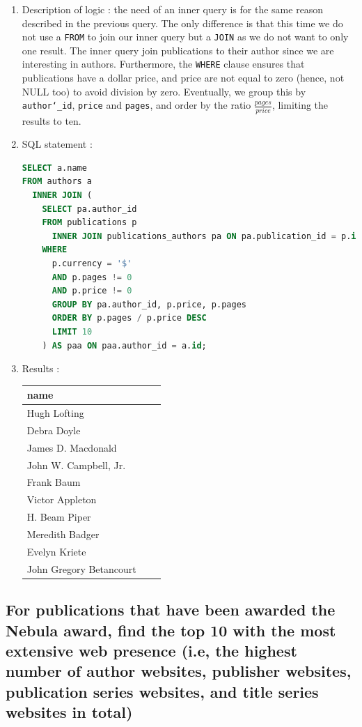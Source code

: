 \documentclass[doubleside, titlepage]{article}
\begin{document}
	\begin{enumerate}
	\item Description of logic : the need of an inner query is for the same reason described in the previous query. The only difference is that this time we do not use a \texttt{FROM} to join our inner query but a \texttt{JOIN} as we do not want to only one result. The inner query join publications to their author since we are interesting in authors. Furthermore, the \texttt{WHERE} clause ensures that publications have a dollar price, and price are not equal to zero (hence, not NULL too) to avoid division by zero. Eventually, we group this by \texttt{author\char`_id}, \texttt{price} and \texttt{pages}, and order by the ratio $\frac{pages}{price}$, limiting the results to ten.
	\item SQL statement :
		\begin{lstlisting}[language=SQL,showspaces=false,basicstyle=\ttfamily,numberstyle=\tiny,commentstyle=\color{gray}]
SELECT a.name
FROM authors a
  INNER JOIN (
    SELECT pa.author_id
    FROM publications p
      INNER JOIN publications_authors pa ON pa.publication_id = p.id
    WHERE
      p.currency = '$'
      AND p.pages != 0
      AND p.price != 0
      GROUP BY pa.author_id, p.price, p.pages
      ORDER BY p.pages / p.price DESC
      LIMIT 10
	) AS paa ON paa.author_id = a.id;
		\end{lstlisting}

	\item Results :\\

	\begin{tabular}{|l|c|r|}
	  \hline
		name\\
	  \hline
Hugh Lofting\\
Debra Doyle\\
James D. Macdonald\\
John W. Campbell, Jr.\\
Frank Baum\\
Victor Appleton\\
H. Beam Piper\\
Meredith Badger\\
Evelyn Kriete\\
John Gregory Betancourt\\
	  \hline
	\end{tabular}
\end{enumerate}

\newpage

\subsection{For publications that have been awarded the Nebula award, find the top 10 with the most extensive web presence  (i.e, the highest number of author websites, publisher websites, publication series websites, and title series websites in total)}
\end{document}

